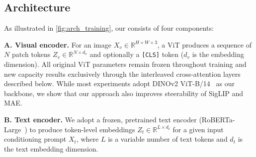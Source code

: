
\vspace{-4mm}
\subsection{Architecture}
\vspace{-1mm}
\label{sec:arch}


As illustrated in \cref{fig:arch_training}, our \model{} consists of four components:

\colorbox{visionblue}{\textbf{A. Visual encoder.}}
For an image $X_v \in \mathbb{R}^{H \times W \times 3}$, a ViT produces a sequence of $N$ patch tokens $Z_v \in \mathbb{R}^{N \times d_v}$ and optionally a  \texttt{[CLS]} token ($d_v$ is the embedding dimension).
All original ViT parameters remain frozen throughout training and new capacity results exclusively through the interleaved cross-attention layers described below.
While most experiments adopt DINOv2 ViT-B/14~\cite{dinov2} as our backbone, we show that our approach also improves steerability of SigLIP and MAE.


\colorbox[RGB]{234,133,125}{\textbf{B. Text encoder.}}
We adopt a frozen, pretrained text encoder (RoBERTa-Large~\cite{liu2019roberta}) to produce token-level embeddings $Z_t \in \mathbb{R}^{L \times d_t}$ for a given input conditioning prompt $X_t$, where $L$ is a variable number of text tokens and $d_t$ is the text embedding dimension.


